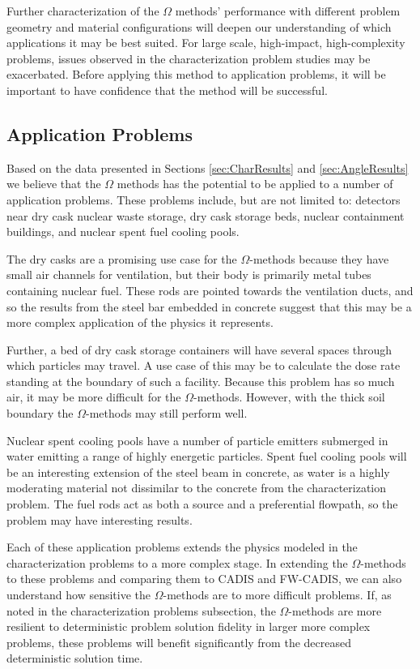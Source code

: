 Further characterization of the $\Omega$ methods' performance with different
problem geometry and material configurations will deepen our understanding of
which applications it may be best suited. For large scale, high-impact,
high-complexity problems, issues observed in the characterization problem
studies may be exacerbated. Before applying this method to application problems,
it will be important to have confidence that the method will be successful.

\subsection{Application Problems}
\label{subsec:appprobs}

Based on the data presented in Sections \ref{sec:CharResults} and
\ref{sec:AngleResults} we believe that the
$\Omega$ methods has the potential to be applied to a number of application problems.
These
problems include, but are not limited to: detectors near dry cask nuclear waste
storage, dry cask storage beds, nuclear containment buildings, and nuclear spent fuel
cooling pools.

The dry casks are a promising use case for the $\Omega$-methods because
they have small air
channels for ventilation, but their body is primarily metal tubes containing
nuclear fuel. These rods are pointed towards the ventilation ducts, and so the
results from the steel bar embedded in concrete suggest that this may be a more
complex application of the physics it represents.

Further, a bed of dry cask storage containers will have several spaces through
which particles may travel. A use case of this may be to calculate the dose rate
standing at the boundary of such a facility. Because this problem has so much
air, it may be more difficult for the $\Omega$-methods. However, with the thick
soil boundary the $\Omega$-methods may still perform well.

Nuclear spent cooling pools have a number of particle emitters submerged
in water emitting a range of highly energetic particles. Spent fuel cooling
pools will be an interesting extension of the steel beam in concrete, as water
is a highly moderating material not dissimilar to the concrete from the
characterization problem. The fuel rods act as both a source and a preferential
flowpath, so the problem may have interesting results.

Each of these application problems extends the physics modeled in the
characterization problems to a more complex stage. In extending the
$\Omega$-methods to these problems and comparing them to CADIS and FW-CADIS, we
can also understand how sensitive the $\Omega$-methods are to more difficult
problems. If, as noted in the characterization problems subsection, the
$\Omega$-methods are more resilient to deterministic problem solution fidelity
in larger more complex problems,
these problems will benefit significantly from the decreased deterministic
solution time.
